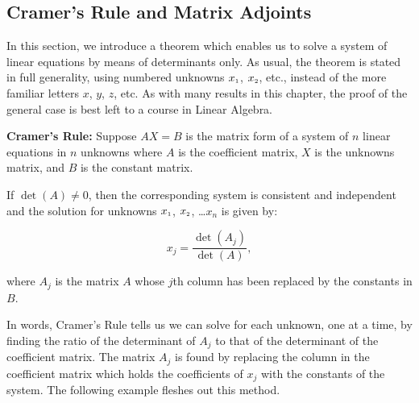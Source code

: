 \documentclass{ximera}
\begin{document}
\newpage

\subsection{Cramer's Rule and Matrix Adjoints}
\label{CramersRuleMatrixAdjoints}

In this section, we introduce a theorem which enables us to solve a system of linear equations by means of determinants only.  As usual, the theorem is stated in full generality, using numbered unknowns $x_{\mbox{\tiny$1$}}$, $x_{\mbox{\tiny$2$}}$, etc., instead of the more familiar letters $x$, $y$, $z$, etc.   As with many results in this chapter, the proof of the general case is best left to a course in Linear Algebra.

\smallskip


\begin{theorem} \label{CramersRule}  \textbf{Cramer's Rule:} Suppose  $AX = B$ is the matrix form of a system of $n$ linear equations in $n$ unknowns where $A$ is the coefficient matrix, $X$ is the unknowns matrix, and $B$ is the constant matrix. 

If $\det(A) \neq 0$, then the corresponding system is consistent and independent and the solution for unknowns $x_{\mbox{\tiny$1$}}$, $x_{\mbox{\tiny$2$}}$, \ldots $x_{n}$ is given by:

\[ x_{j} = \dfrac{\det\left(A_{j}\right)}{\det(A)},\]

where $A_{j}$ is the matrix $A$ whose $j$th column has been replaced by the constants in $B$.

\end{theorem}


\smallskip

In words, Cramer's Rule tells us we can solve for each unknown, one at a time, by finding the ratio of the determinant of $A_{j}$ to that of the determinant of the coefficient matrix.  The matrix $A_{j}$ is found by replacing the column in the coefficient matrix which holds the coefficients of $x_{j}$ with the constants of the system.  The following example fleshes out this method.

\smallskip
\end{document}
